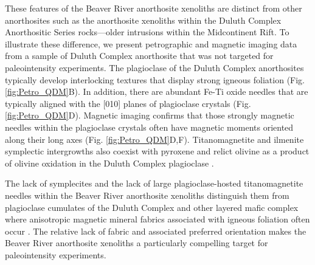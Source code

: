 \documentclass[9pt,twocolumn,twoside,lineno]{pnas-new}
\begin{document}
These features of the Beaver River anorthosite xenoliths are distinct from other anorthosites such as the anorthosite xenoliths within the Duluth Complex Anorthositic Series rocks---older intrusions within the Midcontinent Rift. To illustrate these difference, we present petrographic and magnetic imaging data from a sample of Duluth Complex anorthosite that was not targeted for paleointensity experiments. The plagioclase of the Duluth Complex anorthosites typically develop interlocking textures that display strong igneous foliation (Fig. \ref{fig:Petro_QDM}B). In addition, there are abundant Fe-Ti oxide needles that are typically aligned with the [010] planes of plagioclase crystals (Fig. \ref{fig:Petro_QDM}D). Magnetic imaging confirms that those strongly magnetic needles within the plagioclase crystals often have magnetic moments oriented along their long axes (Fig. \ref{fig:Petro_QDM}D,F). Titanomagnetite and ilmenite symplectic intergrowths also coexist with pyroxene and relict olivine as a product of olivine oxidation in the Duluth Complex plagioclase \cite{Miller1990a}.

The lack of symplecites and the lack of large plagioclase-hosted titanomagnetite needles within the Beaver River anorthosite xenoliths distinguish them from plagioclase cumulates of the Duluth Complex and other layered mafic complex where anisotropic magnetic mineral fabrics associated with igneous foliation often occur \cite{Scofield1986a, Selkin2000a, Feinberg2006a}. The relative lack of fabric and associated preferred orientation makes the Beaver River anorthosite xenoliths a particularly compelling target for paleointensity experiments.
\end{document}
